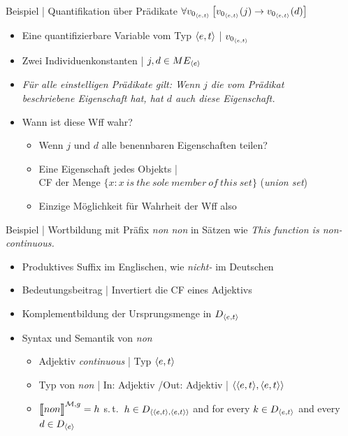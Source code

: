 \begin{frame}
  {Beispiel | Quantifikation über Prädikate}
  \onslide<+->
  \onslide<+->
  \alert{$\forall{}v_{0_{{\langle{}e,t\rangle}}}\left[{}v_{0_{{\langle{}e,t\rangle}}}(j)\rightarrow v_{0_{{\langle{}e,t\rangle}}}(d)\right]$}
  \Halbzeile
  \begin{itemize}[<+->]
    \item Eine quantifizierbare Variable vom Typ ${\langle{}e,t\rangle}$ | \alert{$v_{0_{{\langle{}e,t\rangle}}}$}
    \item Zwei Individuenkonstanten | $j,d\in ME_{{\langle{}e\rangle}}$ 
    \item \textit{Für alle einstelligen Prädikate gilt: Wenn $j$ die vom Prädikat\\
      beschriebene Eigenschaft hat, hat $d$ auch diese Eigenschaft.}
      \Halbzeile
    \item Wann ist diese Wff wahr?
      \begin{itemize}[<+->]
        \item Wenn $j$ und $d$ \alert{alle benennbaren Eigenschaften teilen}?
        \item Eine Eigenschaft jedes Objekts |\\
          \alert{CF der Menge $\{x:x\ is\ the\ sole\ member\ of\ this\ set\}$} (\textit{union set})
        \item Einzige Möglichkeit für Wahrheit der Wff also 
      \end{itemize}
  \end{itemize}
\end{frame}

\begin{frame}
  {Beispiel | Wortbildung mit Präfix \textit{non}}
  \onslide<+->
  \onslide<+->
  \textit{non} in Sätzen wie \textit{This function is \alert{non-continuous}.}\\
  \Halbzeile
  \begin{itemize}[<+->]
    \item Produktives Suffix im Englischen, wie \textit{nicht-} im Deutschen
    \item Bedeutungsbeitrag | \alert{Invertiert die CF} eines Adjektivs
    \item \alert{Komplementbildung} der Ursprungsmenge in $D_{{\langle{}e,t\rangle}}$
      \Halbzeile
    \item Syntax und Semantik von \textit{non}
      \Viertelzeile
      \begin{itemize}[<+->]
        \item Adjektiv \textit{continuous} | Typ ${\langle{}e,t\rangle}$
        \item Typ von \textit{non} | In: Adjektiv \slash Out: Adjektiv | \alert{${\langle{}{\langle{}e,t\rangle},{\langle{}e,t\rangle}\rangle}$}
          \Viertelzeile
        \item $\DEM{non}=h$ s.\,t.\ \alert{$h\in D_{{\langle{}{\langle{}e,t\rangle},{\langle{}e,t\rangle}\rangle}}$} and for every $k\in{}D_{{\langle{}e,t\rangle}}$ and every $d\in D_{{\langle{}e\rangle}}$\\

      \end{itemize}
  \end{itemize}
\end{frame}

